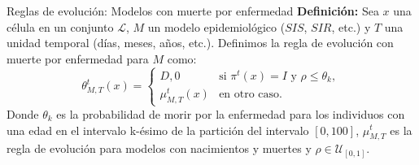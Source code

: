 \documentclass[9pt]{beamer}
\begin{document}

\begin{frame}{Reglas de evolución: Modelos con muerte por enfermedad}
\textbf{Definición:} Sea $x$ una célula en un conjunto $\mathcal{L}$, $M$ un modelo epidemiológico ($SIS$, $SIR$, etc.) y $T$ una unidad temporal (días, meses, años, etc.). Definimos la regla de evolución con muerte por enfermedad para $M$ como:
\begin{equation}
    \theta_{M,T}^t(x)=\left\{\begin{array}{ll}
        D,0 & \text{si }\pi^t(x)=I\text{ y }\rho\leq\theta_k, \\
        \mu_{M,T}^t(x) & \text{en otro caso.}
    \end{array}\right.
\end{equation}
Donde $\theta_k$ es la probabilidad de morir por la enfermedad para los individuos con una edad en el intervalo k-ésimo de la partición del intervalo $[0,100]$, $\mu_{M,T}^t$ es la regla de evolución para modelos con nacimientos y muertes y $\rho\in\mathcal{U}_{[0,1]}$.

\end{frame}
\end{document}
